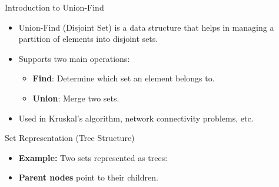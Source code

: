 \begin{frame}{Introduction to Union-Find}
    \begin{itemize}
        \item Union-Find (Disjoint Set) is a data structure that helps in managing a partition of elements into disjoint sets.
        \item Supports two main operations:
        \begin{itemize}
            \item \textbf{Find}: Determine which set an element belongs to.
            \item \textbf{Union}: Merge two sets.
        \end{itemize}
        \item Used in Kruskal's algorithm, network connectivity problems, etc.
    \end{itemize}
\end{frame}

\begin{frame}{Set Representation (Tree Structure)}
    \begin{itemize}
        \item \textbf{Example:} Two sets represented as trees:
        \item \textbf{Parent nodes} point to their children.
    \end{itemize}

    \centering

\end{frame}



